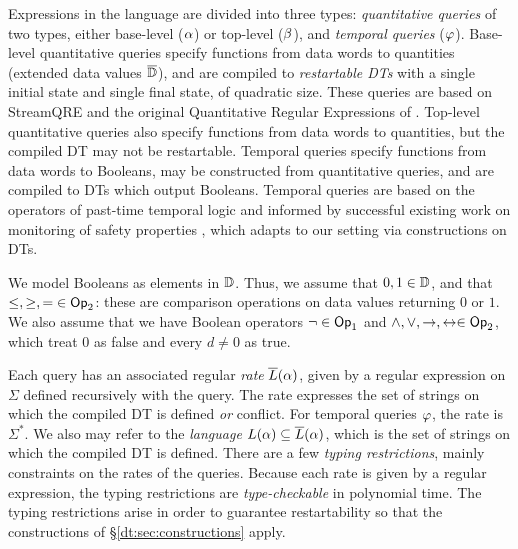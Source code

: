 Expressions in the language are divided into three types: \emph{quantitative queries} of two types, either base-level ($\alpha$) or top-level ($\beta$), and \emph{temporal queries} ($\varphi$). Base-level quantitative queries specify functions from data words to quantities (extended data values $\overline{\mathbb{D}{}}$), and are compiled to \emph{restartable DTs} with a single initial state and single final state, of quadratic size. These queries are based on StreamQRE and the original Quantitative Regular Expressions of \cite{AFR2016QRE}. Top-level quantitative queries also specify functions from data words to quantities, but the compiled DT may not be restartable. Temporal queries specify functions from data words to Booleans, may be constructed from quantitative queries, and are compiled to DTs which output Booleans. Temporal queries are based on the operators of past-time temporal logic \cite{manna2012temporal} and informed by successful existing work on monitoring of safety properties \cite{havelund2004efficient}, which adapts to our setting via constructions on DTs.

We model Booleans as elements in $\mathbb{D}$. Thus, we assume that $0, 1 \in \mathbb{D}$, and that $\le, \ge, = \;\in \textsf{Op}_2$: these are comparison operations on data values returning $0$ or $1$. We also assume that we have Boolean operators $\lnot \in \textsf{Op}_1$ and $\land, \lor, \to, \leftrightarrow \in \textsf{Op}_2$,
which treat $0$ as false and every $d \ne 0$ as true.

Each query has an associated regular \emph{rate} $\overline{L}(\alpha)$, given by a regular expression on $\Sigma$ defined recursively with the query. The rate expresses the set of strings on which the compiled DT is defined \emph{ or } conflict. For temporal queries $\varphi$, the rate is $\Sigma^{*}$. We also may refer to the \emph{language} $L(\alpha) \subseteq \overline{L}(\alpha)$, which is the set of strings on which the compiled DT is defined.
There are a few \emph{typing restrictions}, mainly constraints on the rates of the queries. Because each rate is given by a regular expression, the typing restrictions are \emph{type-checkable} in polynomial time.
The typing restrictions arise in order to guarantee restartability so that the constructions of \S\ref{dt:sec:constructions} apply.


